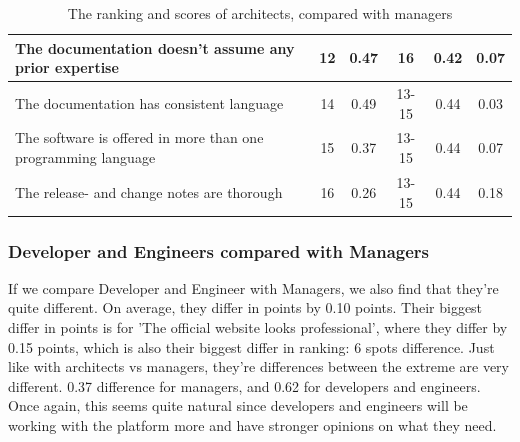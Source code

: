 \documentclass{article}
\begin{document}
\begin{table}[H]
\begin{tabularx}{\columnwidth}{X|c:c|c:c|c}
The documentation doesn't assume any prior expertise                  &        12 & 0.47       &           16 & 0.42           & 0.07  \\ \hline
The documentation has consistent language                             &        14 & 0.49       &        13-15 & 0.44           & 0.03  \\ \hline
The software is offered in more than one programming language         &        15 & 0.37       &        13-15 & 0.44           & 0.07  \\ \hline
The release- and change notes are thorough                            &        16 & 0.26       &        13-15 & 0.44           & 0.18  \\ \hline
\end{tabularx}
\caption{The ranking and scores of architects, compared with managers}
\label{tab:arch-man}
\end{table}

\subsubsection{Developer and Engineers compared with Managers}
If we compare Developer and Engineer with Managers, we also find that
they're quite different. On average, they differ in points by 0.10
points. Their biggest differ in points is for 'The official website
looks professional', where they differ by 0.15 points, which is also
their biggest differ in ranking: 6 spots difference. Just like with architects vs managers, they're differences between the extreme are very different. 0.37 difference for managers, and 0.62 for developers and engineers. Once again, this seems quite natural since developers and engineers will be working with the platform more and have stronger opinions on what they need.
\end{document}
